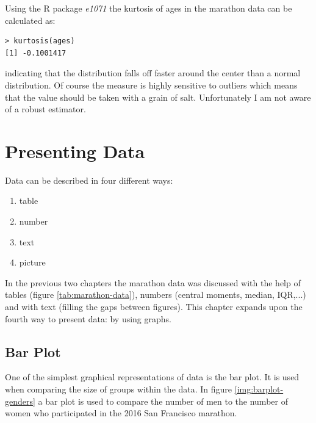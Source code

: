 \documentclass{tufte-book} %
\begin{document}
Using the R package {\em e1071} the kurtosis of ages in the marathon data can be calculated as:

\begin{Verbatim}
> kurtosis(ages)
[1] -0.1001417
\end{Verbatim}

indicating that the distribution falls off faster around the center than a normal distribution. Of course the measure is highly sensitive to outliers which means that the value should be taken with a grain of salt. Unfortunately I am not aware of a robust estimator.


\chapter{Presenting Data}
\label{ch:presenting-data}
Data can be described in four different ways: 

\begin{enumerate}
	\item table
	\item number
	\item text
	\item picture
\end{enumerate}

In the previous two chapters the marathon data was discussed with the help of tables (figure \ref{tab:marathon-data}), numbers (central moments, median, IQR,...) and with text (filling the gaps between figures). This chapter expands upon the fourth way to present data: by using graphs.

\section{Bar Plot}
One of the simplest graphical representations of data is the bar plot. It is used when comparing the size of groups within the data. In figure \ref{img:barplot-genders} a bar plot is used to compare the number of men to the number of women who participated in the 2016 San Francisco marathon. 
\end{document}
